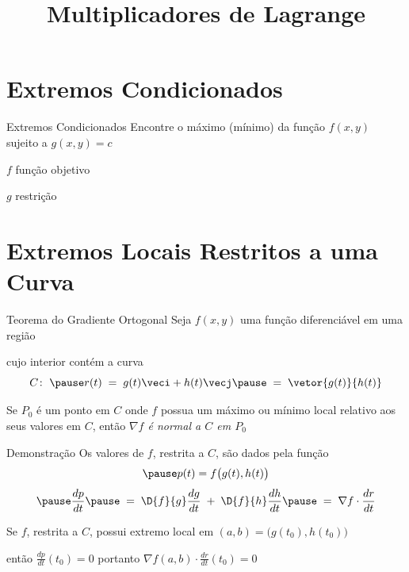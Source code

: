 \documentclass[fleqn,utf8,aspectratio=169,12pt]{beamer}
\title{Multiplicadores de Lagrange}
\begin{document}
\addtitle

\section{Extremos Condicionados}

\begin{frame}{Extremos Condicionados}
  Encontre o máximo (mínimo) da função \(f(x, y)\)\\[2mm]
  sujeito a \(g(x, y) = c\)

  \pause
  \vspace{\baselineskip}
  \quad \emph{$f$} \quad função objetivo

  \pause
  \quad \emph{$g$} \quad restrição
\end{frame}


\section{Extremos Locais Restritos a uma Curva}

\begin{frame}{Teorema do Gradiente Ortogonal}
  Seja \(f(x, y)\) uma função diferenciável em uma região

  \pause
  cujo interior contém a curva
  \[
    C\colon\;
    \pause r(t) \;=\; g(t)\veci + h(t)\vecj
    \pause \;=\; \vetor{g(t)}{h(t)}
  \]

  \pause
  Se $P_0$ é um ponto em $C$ onde $f$ possua um máximo ou mínimo local relativo
  aos seus valores em $C$,
  \pause
  então \emph{\(\nabla f\) é normal a $C$ em $P_0$}
\end{frame}

\begin{proofframe}{Demonstração}
  Os valores de $f$, restrita a $C$, são dados pela função
  \[
    \pause
    p(t) = f\big(g(t), h(t)\big)
  \]
  \[
    \pause
    \frac{dp}{dt}
    \pause
    \;=\; \D{f}{g}\frac{dg}{dt}
    \;+\; \D{f}{h}\frac{dh}{dt}
    \pause
    \;=\; \nabla f \cdot \frac{dr}{dt}
  \]

  \pause
  Se $f$, restrita a $C$, possui extremo local em
  \(
    (a, b) = \big(g(t_0), h(t_0)\big)
  \)

  \pause
  \vspace{0.4\baselineskip}
  então
  \(
    \frac{dp}{dt}(t_0) = 0
  \)
  \pause
  \qquad
  portanto
  \quad
  \emph{
  \(
    \nabla f(a, b) \cdot \frac{dr}{dt}(t_0) = 0
  \)}
\end{proofframe}
\end{document}

